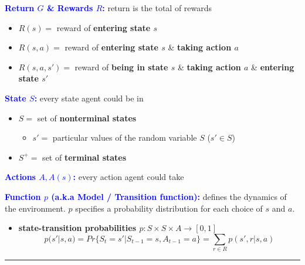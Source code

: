 \documentclass[12pt, a4paper]{article}
\begin{document}
\textcolor{blue}{\textbf{Return \(G\) \& Rewards \(R\):}} return is the total of rewards

\begin{itemize}
  \item \(R(s) =\) reward of \textbf{entering state \(s\)}
  \item \(R(s, a) =\) reward of \textbf{entering state \(s\)} \& \textbf{taking action \(a\)}
  \item \(R(s, a, s') =\) reward of \textbf{being in state \(s\)} \& \textbf{taking action \(a\)} \& \textbf{entering state \(s'\)}
\end{itemize}

\textcolor{blue}{\textbf{State \(S\):}} every state agent could be in

\begin{itemize}
  \item \(S =\) set of \textbf{nonterminal states}
  \begin{itemize}
    \item \(s' =\) particular values of the random variable \(S\) (\(s' \in S\))
  \end{itemize}
  \item \(S^+ =\) set of \textbf{terminal states}
\end{itemize}

\textcolor{blue}{\textbf{Actions \(A, A(s)\):}} every action agent could take

\textcolor{blue}{\textbf{Function \(p\) (a.k.a Model / Transition function):}} defines the
dynamics of the environment. \(p\) specifies a probability distribution
for each choice of \(s\) and \(a\).

\begin{itemize}
  \item \textbf{state-transition
  probabilities \(p : S \times S \times A \rightarrow [0, 1]\)}
  $$
  p(s'|s, a) = Pr\{S_t = s'| S_{t-1} = s, A_{t-1} = a\} = \sum_{r \in R} p(s', r|s, a)
  $$
\end{itemize}

\begin{center}\rule{0.5\linewidth}{0.5pt}\end{center}












\end{document}
